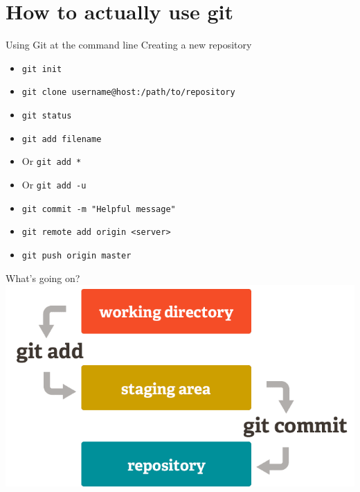 \documentclass{beamer}
\begin{document}

\section{How to actually use git} %
\label{sec:how_to_actually_use_git}
\begin{frame}[fragile]{Using Git at the command line}
	Creating a new repository
	\begin{itemize}
		\item<1-> \verb|git init|
	\end{itemize}
	\begin{itemize}
		\item<2-> \verb|git clone username@host:/path/to/repository|
	\end{itemize}
	\begin{itemize}
		\item<3-> \verb|git status|
	\end{itemize}
	\begin{itemize}
		\item<4-> \verb|git add filename|
		\item<5-> Or \verb|git add *|
		\item<6-> Or \verb|git add -u|
	\end{itemize}
	\begin{itemize}
		\item<7-> \verb|git commit -m "Helpful message"|
	\end{itemize}
	\begin{itemize}
		\item<8-> \verb|git remote add origin <server>|
	\end{itemize}
	\begin{itemize}
		\item<9-> \verb|git push origin master|
	\end{itemize}
\end{frame}

\begin{frame}[fragile]{What's going on?}
	\includegraphics[width=\textwidth]{gitstaging}
\end{frame}
\end{document}
